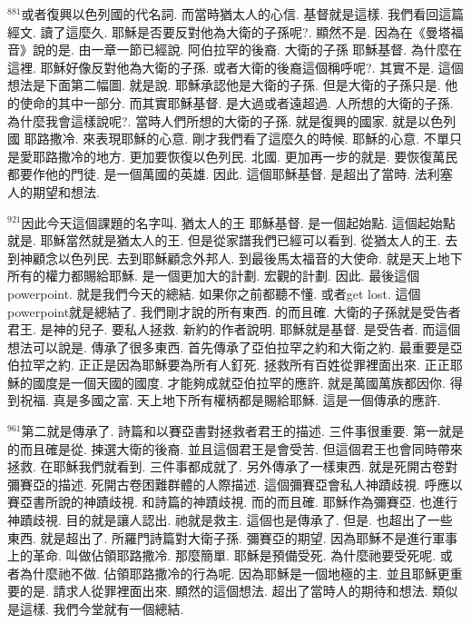 \documentclass{book}
\begin{document}
$^{881}$或者復興以色列國的代名詞.
而當時猶太人的心信.
基督就是這樣.
我們看回這篇經文.
讀了這麼久.
耶穌是否要反對他為大衛的子孫呢?.
顯然不是.
因為在《曼塔福音》說的是.
由一章一節已經說.
阿伯拉罕的後裔.
大衛的子孫 耶穌基督.
為什麼在這裡.
耶穌好像反對他為大衛的子孫.
或者大衛的後裔這個稱呼呢?.
其實不是.
這個想法是下面第二幅圖.
就是說.
耶穌承認他是大衛的子孫.
但是大衛的子孫只是.
他的使命的其中一部分.
而其實耶穌基督.
是大過或者遠超過.
人所想的大衛的子孫.
為什麼我會這樣說呢?.
當時人們所想的大衛的子孫.
就是復興的國家.
就是以色列國 耶路撒冷.
來表現耶穌的心意.
剛才我們看了這麼久的時候.
耶穌的心意.
不單只是愛耶路撒冷的地方.
更加要恢復以色列民.
北國.
更加再一步的就是.
要恢復萬民都要作他的門徒.
是一個萬國的英雄.
因此.
這個耶穌基督.
是超出了當時.
法利塞人的期望和想法.

$^{921}$因此今天這個課題的名字叫.
猶太人的王 耶穌基督.
是一個起始點.
這個起始點就是.
耶穌當然就是猶太人的王.
但是從家譜我們已經可以看到.
從猶太人的王.
去到神顧念以色列民.
去到耶穌顧念外邦人.
到最後馬太福音的大使命.
就是天上地下所有的權力都賜給耶穌.
是一個更加大的計劃.
宏觀的計劃.
因此.
最後這個powerpoint.
就是我們今天的總結.
如果你之前都聽不懂.
或者get lost.
這個powerpoint就是總結了.
我們剛才說的所有東西.
的而且確.
大衛的子孫就是受告者君王.
是神的兒子.
要私人拯救.
新約的作者說明.
耶穌就是基督.
是受告者.
而這個想法可以說是.
傳承了很多東西.
首先傳承了亞伯拉罕之約和大衛之約.
最重要是亞伯拉罕之約.
正正是因為耶穌要為所有人釘死.
拯救所有百姓從罪裡面出來.
正正耶穌的國度是一個天國的國度.
才能夠成就亞伯拉罕的應許.
就是萬國萬族都因你.
得到祝福.
真是多國之富.
天上地下所有權柄都是賜給耶穌.
這是一個傳承的應許.

$^{961}$第二就是傳承了.
詩篇和以賽亞書對拯救者君王的描述.
三件事很重要.
第一就是的而且確是從.
揀選大衛的後裔.
並且這個君王是會受苦.
但這個君王也會同時帶來拯救.
在耶穌我們就看到.
三件事都成就了.
另外傳承了一樣東西.
就是死開古卷對彌賽亞的描述.
死開古卷困難群體的人際描述.
這個彌賽亞會私人神蹟歧視.
呼應以賽亞書所說的神蹟歧視.
和詩篇的神蹟歧視.
而的而且確.
耶穌作為彌賽亞.
也進行神蹟歧視.
目的就是讓人認出.
祂就是救主.
這個也是傳承了.
但是.
也超出了一些東西.
就是超出了.
所羅門詩篇對大衛子孫.
彌賽亞的期望.
因為耶穌不是進行軍事上的革命.
叫做佔領耶路撒冷.
那麼簡單.
耶穌是預備受死.
為什麼祂要受死呢.
或者為什麼祂不做.
佔領耶路撒冷的行為呢.
因為耶穌是一個地極的主.
並且耶穌更重要的是.
請求人從罪裡面出來.
顯然的這個想法.
超出了當時人的期待和想法.
類似是這樣.
我們今堂就有一個總結.
\end{document}
